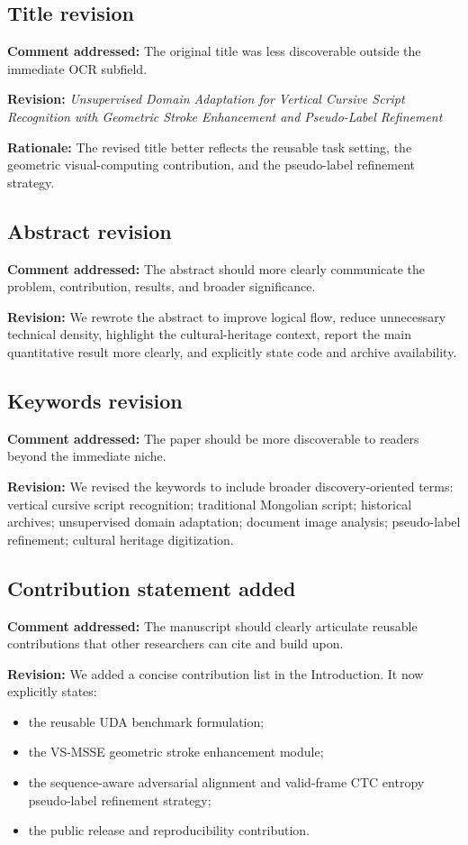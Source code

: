 \documentclass[11pt]{article}
\begin{document}
\subsection{Title revision}
\textbf{Comment addressed:} The original title was less discoverable outside the immediate OCR subfield.

\textbf{Revision:} \textit{Unsupervised Domain Adaptation for Vertical Cursive Script Recognition with Geometric Stroke Enhancement and Pseudo-Label Refinement}

\textbf{Rationale:} The revised title better reflects the reusable task setting, the geometric visual-computing contribution, and the pseudo-label refinement strategy.

\subsection{Abstract revision}
\textbf{Comment addressed:} The abstract should more clearly communicate the problem, contribution, results, and broader significance.

\textbf{Revision:} We rewrote the abstract to improve logical flow, reduce unnecessary technical density, highlight the cultural-heritage context, report the main quantitative result more clearly, and explicitly state code and archive availability.

\subsection{Keywords revision}
\textbf{Comment addressed:} The paper should be more discoverable to readers beyond the immediate niche.

\textbf{Revision:} We revised the keywords to include broader discovery-oriented terms: vertical cursive script recognition; traditional Mongolian script; historical archives; unsupervised domain adaptation; document image analysis; pseudo-label refinement; cultural heritage digitization.

\subsection{Contribution statement added}
\textbf{Comment addressed:} The manuscript should clearly articulate reusable contributions that other researchers can cite and build upon.

\textbf{Revision:} We added a concise contribution list in the Introduction. It now explicitly states:
\begin{itemize}[leftmargin=1.5em]
\item the reusable UDA benchmark formulation;
\item the VS-MSSE geometric stroke enhancement module;
\item the sequence-aware adversarial alignment and valid-frame CTC entropy pseudo-label refinement strategy;
\item the public release and reproducibility contribution.
\end{itemize}
\end{document}
